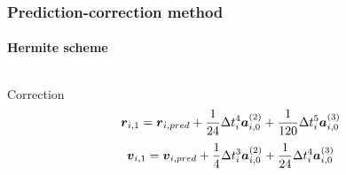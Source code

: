 \begin{frame}
\begin{columns}
\begin{column}{0.5\textwidth}
\begin{figure}
                \label{fig:algoritmo}
            \end{figure}
        \end{column}
    \end{columns}
\end{frame}

\begin{frame}
    \frametitle{Prediction-correction method}
    \framesubtitle{Hermite scheme}
    \begin{columns}
        \begin{column}{0.5\textwidth}
        \begin{block}{Correction}
        \small
        \begin{dmath}
            \bs{r}_{i,1} = \bs{r}_{i,pred} +
                                \frac{1}{24}  \Delta t_{i}^{4} \bs{a}_{i,0}^{(2)} +
                                \frac{1}{120} \Delta t_{i}^{5} \bs{a}_{i,0}^{(3)} \\
        \end{dmath}
        \begin{dmath}
            \bs{v}_{i,1} = \bs{v}_{i,pred} +
                                \frac{1}{4}  \Delta t_{i}^{3} \bs{a}_{i,0}^{(2)} +
                                \frac{1}{24} \Delta t_{i}^{4} \bs{a}_{i,0}^{(3)}
        \end{dmath}


\end{block}
\end{column}
\end{columns}
\end{frame}
